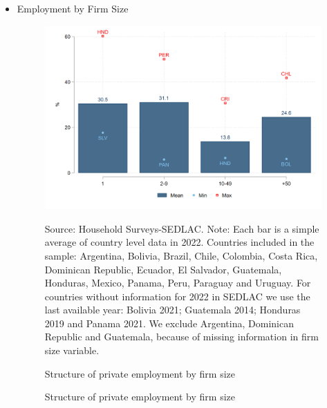 \documentclass[english]{article}
\begin{document}
\begin{itemize}
            
        \item Employment by Firm Size
            \begin{figure}[H]
                    \justifying
                    \caption{Structure of private employment by firm size}     
                    \centerline{\includegraphics[scale=.3]{latex/figures/Snapshot/Structure of employment by firm size.png}
                    \label{fig:firmsize}}
                    \footnotesize{Source: Household Surveys-SEDLAC.}
                    \footnotesize{Note: Each bar is a simple average of country level data in 2022. Countries included in the sample: Argentina, Bolivia, Brazil, Chile, Colombia, Costa Rica, Dominican Republic, Ecuador, El Salvador, Guatemala, Honduras, Mexico, Panama, Peru, Paraguay and Uruguay. For countries without information for 2022 in SEDLAC we use the last available year: Bolivia 2021; Guatemala 2014; Honduras 2019 and Panama 2021. We exclude Argentina, Dominican Republic and Guatemala, because of missing information in firm size variable.}
            \end{figure}
            
\begin{figure}[H]
    \centering
    \caption{Structure of private employment by firm size}
    \qquad
    \label{fig:example}%
\end{figure}
            

\end{itemize}
\end{document}

